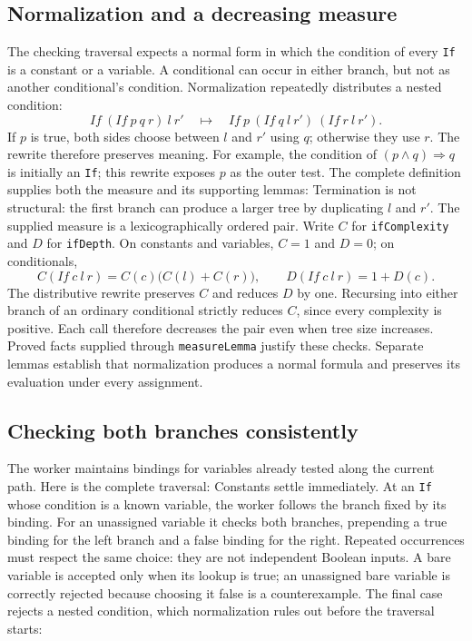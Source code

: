 \documentclass[review]{jfp-epi}
\newcommand{\code}[1]{\texttt{#1}}
\begin{document}
\subsection{Normalization and a decreasing measure}

The checking traversal expects a normal form in which the condition of every
\code{If} is a constant or a variable. A conditional can occur in either branch,
but not as another conditional's condition. Normalization repeatedly distributes
a nested condition:
\[
 \mathit{If}\ (\mathit{If}\ p\ q\ r)\ l\ r'
 \quad\longmapsto\quad
 \mathit{If}\ p\ (\mathit{If}\ q\ l\ r')\ (\mathit{If}\ r\ l\ r').
\]
If $p$ is true, both sides choose between $l$ and $r'$ using $q$; otherwise they
use $r$. The rewrite therefore preserves meaning. For example, the condition of
$(p\land q)\Rightarrow q$ is initially an \code{If}; this rewrite exposes $p$
as the outer test. The complete definition supplies both the measure and its
supporting lemmas:
Termination is not structural: the first branch can produce a larger tree by
duplicating $l$ and $r'$. The supplied measure is a lexicographically ordered
pair. Write $C$ for \code{ifComplexity} and $D$ for \code{ifDepth}. On constants
and variables, $C=1$ and $D=0$; on conditionals,
\[
 C(\mathit{If}\ c\ l\ r)=C(c)\bigl(C(l)+C(r)\bigr),
 \qquad D(\mathit{If}\ c\ l\ r)=1+D(c).
\]
The distributive rewrite preserves $C$ and reduces $D$ by one. Recursing into
either branch of an ordinary conditional strictly reduces $C$, since every
complexity is positive. Each call therefore decreases the pair even when tree
size increases. Proved facts supplied through \code{measureLemma} justify these
checks. Separate lemmas establish that normalization produces a normal formula
and preserves its evaluation under every assignment.

\subsection{Checking both branches consistently}

The worker maintains bindings for variables already tested along the current
path. Here is the complete traversal:
Constants settle immediately. At an \code{If} whose condition is a known
variable, the worker follows the branch fixed by its binding. For an unassigned
variable it checks both branches, prepending a true binding for the left branch
and a false binding for the right. Repeated occurrences must respect the same
choice: they are not independent Boolean inputs. A bare variable is accepted
only when its lookup is true; an unassigned bare variable is correctly rejected
because choosing it false is a counterexample. The final case rejects a nested
condition, which normalization rules out before the traversal starts:
\end{document}
